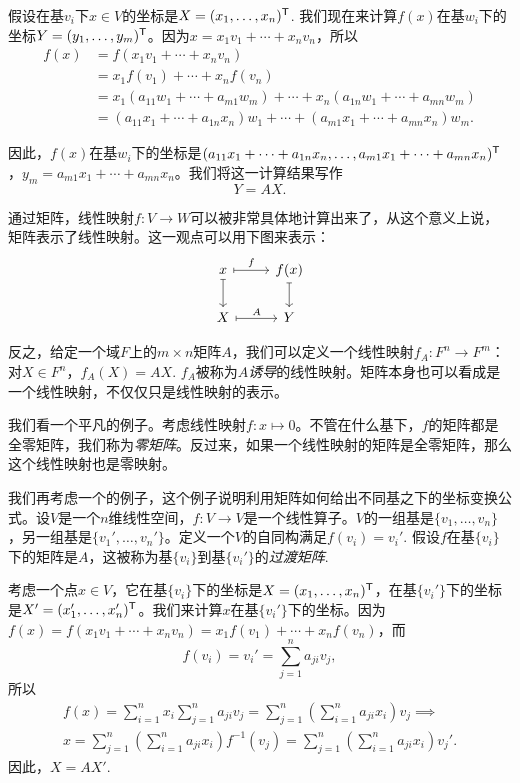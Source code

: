 假设在基$v_i$下$x\in V$的坐标是$X=(x_1,\dots,x_n)^{\mathsf{T}}$. 我们现在来计算$f(x)$在基$w_i$下的坐标$Y=(y_1,\dots,y_m)^{\mathsf{T}}$。因为$x=x_1v_1+\cdots+x_nv_n$，所以
\begin{align*}
    f(x)&=f(x_1v_1+\cdots+x_nv_n)\\
    &=x_1f(v_1)+\cdots+x_nf(v_n)\\
    &=x_1(a_{11}w_1+\cdots+a_{m1}w_m)+\cdots+x_n(a_{1n}w_1+\cdots+a_{mn}w_m)\\
    &=(a_{11}x_1+\cdots+a_{1n}x_n)w_1+\cdots+(a_{m1}x_1+\cdots+a_{mn}x_n)w_m.
\end{align*}

因此，$f(x)$在基$w_i$下的坐标是$(a_{11}x_1+\cdots+a_{1n}x_n,\dots,a_{m1}x_1+\cdots+a_{mn}x_n)^{\mathsf{T}}$，$y_m=a_{m1}x_1+\cdots+a_{mn}x_n$。我们将这一计算结果写作
\[Y=AX.\]


通过矩阵，线性映射$f:V\to W$可以被非常具体地计算出来了，从这个意义上说，矩阵表示了线性映射。这一观点可以用下图来表示：
\[\begin{tikzcd}
    x\arrow[r,mapsto,"f"]\arrow[d,mapsto]&f(x)\arrow[d,mapsto]\\
    X\arrow[r,mapsto,"A"]&Y
    \end{tikzcd}\] 

反之，给定一个域$F$上的$m\times n$矩阵$A$，我们可以定义一个线性映射$f_A:F^n\to F^m$：对$X\in F^n$，$f_A(X)=AX$. $f_A$被称为$A$\emph{诱导}的线性映射。矩阵本身也可以看成是一个线性映射，不仅仅只是线性映射的表示。

我们看一个平凡的例子。考虑线性映射$f:x\mapsto 0$。不管在什么基下，$f$的矩阵都是全零矩阵，我们称为\emph{零矩阵}。反过来，如果一个线性映射的矩阵是全零矩阵，那么这个线性映射也是零映射。

我们再考虑一个的例子，这个例子说明利用矩阵如何给出不同基之下的坐标变换公式。设$V$是一个$n$维线性空间，$f:V\to V$是一个线性算子。$V$的一组基是$\{v_1,\dots,v_n\}$，另一组基是$\{v_1',\dots,v_n'\}$。定义一个$V$的自同构满足$f(v_i)=v_i'$. 假设$f$在基$\{v_i\}$下的矩阵是$A$，这被称为基$\{v_i\}$到基$\{v_i'\}$的\emph{过渡矩阵}.

考虑一个点$x\in V$，它在基$\{v_i\}$下的坐标是$X=(x_1,\dots,x_n)^{\mathsf{T}}$，在基$\{v_i'\}$下的坐标是$X'=(x_1',\dots,x_n')^{\mathsf{T}}$。我们来计算$x$在基$\{v_i'\}$下的坐标。因为$f(x)=f(x_1v_1+\cdots+x_nv_n)=x_1f(v_1)+\cdots+x_nf(v_n)$，而
\[f(v_i)=v_i'=\sum_{j=1}^n a_{ji}v_j,\]
所以
\begin{gather*}
f(x)=\sum_{i=1}^n x_i\sum_{j=1}^n a_{ji}v_j=\sum_{j=1}^n\left(\sum_{i=1}^n a_{ji}x_i\right)v_j\implies\\
 x=\sum_{j=1}^n\left(\sum_{i=1}^n a_{ji}x_i\right)f^{-1}(v_j)=\sum_{j=1}^n\left(\sum_{i=1}^n a_{ji}x_i\right)v_j'.
\end{gather*}
因此，$X=AX'$.


